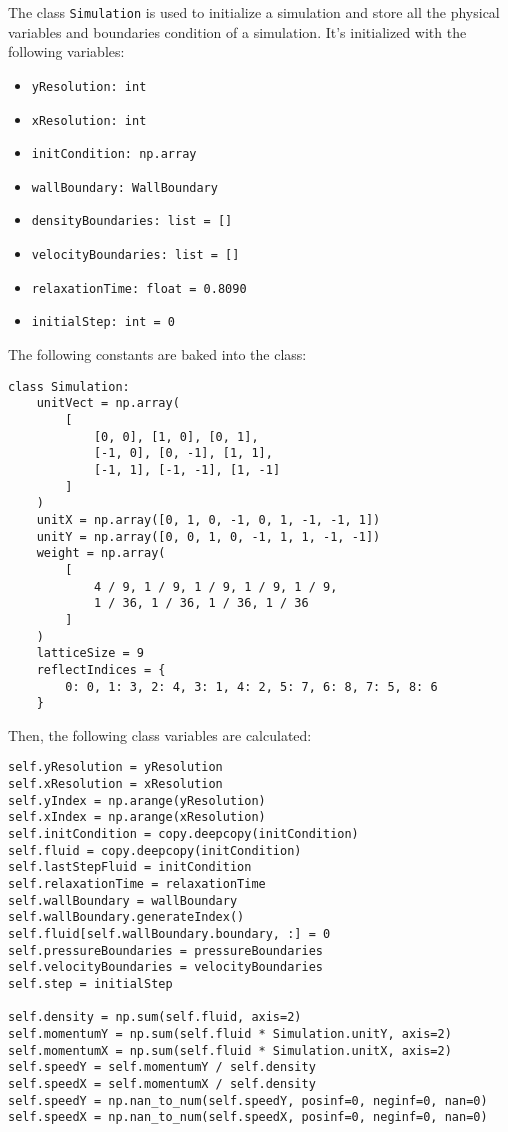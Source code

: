 The class \texttt{Simulation} is used to initialize a simulation and store all the physical variables and boundaries condition of a simulation. It's initialized with the following variables:
\begin{itemize}[noitemsep]
	\item \texttt{yResolution: int}
	\item \texttt{xResolution: int}
	\item \texttt{initCondition: np.array}
	\item \texttt{wallBoundary: WallBoundary}
	\item \texttt{densityBoundaries: list = []}
	\item \texttt{velocityBoundaries: list = []}
	\item \texttt{relaxationTime: float = 0.8090}
	\item \texttt{initialStep: int = 0}
\end{itemize}
The following constants are baked into the class:
\begin{verbatim}
class Simulation:
    unitVect = np.array(
        [
            [0, 0], [1, 0], [0, 1],
            [-1, 0], [0, -1], [1, 1],
            [-1, 1], [-1, -1], [1, -1]
        ]
    )
    unitX = np.array([0, 1, 0, -1, 0, 1, -1, -1, 1])
    unitY = np.array([0, 0, 1, 0, -1, 1, 1, -1, -1])
    weight = np.array(
        [
            4 / 9, 1 / 9, 1 / 9, 1 / 9, 1 / 9,
            1 / 36, 1 / 36, 1 / 36, 1 / 36
        ]
    )
    latticeSize = 9
    reflectIndices = {
        0: 0, 1: 3, 2: 4, 3: 1, 4: 2, 5: 7, 6: 8, 7: 5, 8: 6
    }
\end{verbatim}
Then, the following class variables are calculated:
\begin{verbatim}
self.yResolution = yResolution
self.xResolution = xResolution
self.yIndex = np.arange(yResolution)
self.xIndex = np.arange(xResolution)
self.initCondition = copy.deepcopy(initCondition)
self.fluid = copy.deepcopy(initCondition)
self.lastStepFluid = initCondition
self.relaxationTime = relaxationTime
self.wallBoundary = wallBoundary
self.wallBoundary.generateIndex()
self.fluid[self.wallBoundary.boundary, :] = 0
self.pressureBoundaries = pressureBoundaries
self.velocityBoundaries = velocityBoundaries
self.step = initialStep

self.density = np.sum(self.fluid, axis=2)
self.momentumY = np.sum(self.fluid * Simulation.unitY, axis=2)
self.momentumX = np.sum(self.fluid * Simulation.unitX, axis=2)
self.speedY = self.momentumY / self.density
self.speedX = self.momentumX / self.density
self.speedY = np.nan_to_num(self.speedY, posinf=0, neginf=0, nan=0)
self.speedX = np.nan_to_num(self.speedX, posinf=0, neginf=0, nan=0)
\end{verbatim}

